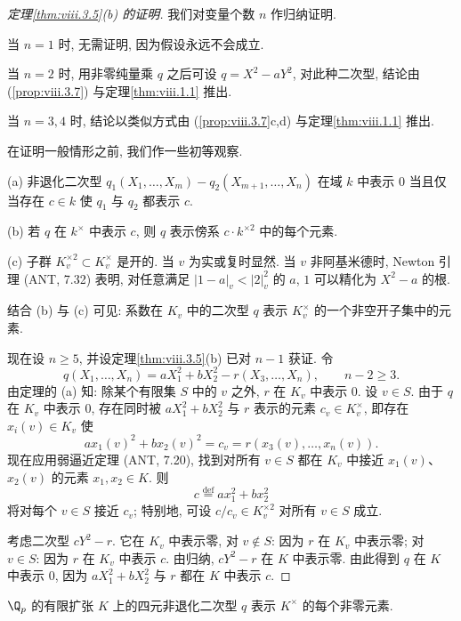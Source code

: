 \begin{proof}[定理\ref{thm:viii.3.5}(b) 的证明]
我们对变量个数 $n$ 作归纳证明.

当 $n=1$ 时, 无需证明, 因为假设永远不会成立.

当 $n=2$ 时, 用非零纯量乘 $q$ 之后可设 $q=X^{2}-aY^{2}$, 对此种二次型, 结论由 (\ref{prop:viii.3.7}) 与定理\ref{thm:viii.1.1} 推出.

当 $n=3,4$ 时, 结论以类似方式由 (\ref{prop:viii.3.7}c,d) 与定理\ref{thm:viii.1.1} 推出.

在证明一般情形之前, 我们作一些初等观察.

(a) 非退化二次型 $q_1(X_1,\ldots,X_m)-q_2(X_{m+1},\ldots,X_n)$ 在域 $k$ 中表示 $0$ 当且仅当存在 $c\in k$ 使 $q_1$ 与 $q_2$ 都表示 $c$.

(b) 若 $q$ 在 $k^\times$ 中表示 $c$, 则 $q$ 表示傍系 $c\cdot k^{\times 2}$ 中的每个元素.

(c) 子群 $K_v^{\times 2}\subset K_v^{\times}$ 是开的. 当 $v$ 为实或复时显然. 当 $v$ 非阿基米德时, Newton 引理 (ANT, 7.32) 表明, 对任意满足 $|1-a|_{v}<|2|_{v}^{2}$ 的 $a$, $1$ 可以精化为 $X^{2}-a$ 的根.

结合 (b) 与 (c) 可见: 系数在 $K_v$ 中的二次型 $q$ 表示 $K_v^{\times}$ 的一个非空开子集中的元素.

现在设 $n\ge 5$, 并设定理\ref{thm:viii.3.5}(b) 已对 $n-1$ 获证. 令
\[
q(X_{1},\ldots,X_{n})=aX_{1}^{2}+bX_{2}^{2}-r(X_{3},\ldots,X_{n}),\qquad n-2\ge 3.
\]
由定理的 (a) 知: 除某个有限集 $S$ 中的 $v$ 之外, $r$ 在 $K_v$ 中表示 $0$. 设 $v\in S$. 由于 $q$ 在 $K_v$ 中表示 $0$, 存在同时被 $aX_1^{2}+bX_2^{2}$ 与 $r$ 表示的元素 $c_v\in K_v^{\times}$, 即存在 $x_i(v)\in K_v$ 使
\[
ax_{1}(v)^{2}+bx_{2}(v)^{2}=c_v=r(x_{3}(v),\ldots,x_{n}(v)).
\]
现在应用弱逼近定理 (ANT, 7.20), 找到对所有 $v\in S$ 都在 $K_v$ 中接近 $x_1(v)$、$x_2(v)$ 的元素 $x_1,x_2\in K$. 则
\[
c\overset{\text{def}}{=}ax_{1}^{2}+bx_{2}^{2}
\]
将对每个 $v\in S$ 接近 $c_v$; 特别地, 可设 $c/c_v\in K_v^{\times 2}$ 对所有 $v\in S$ 成立.

考虑二次型 $cY^{2}-r$. 它在 $K_v$ 中表示零, 对 $v\notin S$: 因为 $r$ 在 $K_v$ 中表示零; 对 $v\in S$: 因为 $r$ 在 $K_v$ 中表示 $c$. 由归纳, $cY^{2}-r$ 在 $K$ 中表示零. 由此得到 $q$ 在 $K$ 中表示 $0$, 因为 $aX_1^{2}+bX_2^{2}$ 与 $r$ 都在 $K$ 中表示 $c$.
\end{proof}

\begin{proposition}\label{prop:viii.3.9}
$\Q_p$ 的有限扩张 $K$ 上的四元非退化二次型 $q$ 表示 $K^{\times}$ 的每个非零元素.
\end{proposition}

